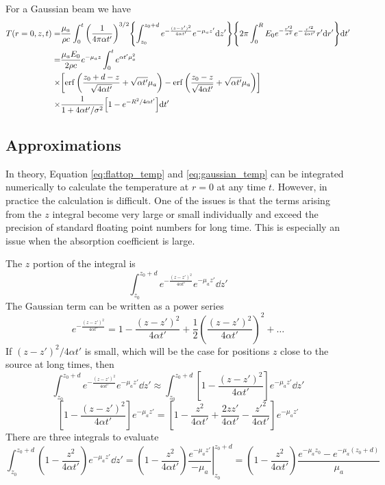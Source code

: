 \documentclass[]{article}
\begin{document}
For a Gaussian beam we have
\begin{align}
  \label{eq:gaussian_temp}
  T(r =0,z,t) =& \frac{\mu_a}{\rho c} \int_0^t \qty(\frac{1}{4\pi \alpha t'})^{3/2} \qty{\int_{z_0}^{z_0 + d}e^{-\frac{(z-z')^2}{4\alpha t'}} e^{-\mu_a z'} \dd z'} \qty{2\pi\int_{0}^{R} E_0 e^{-\frac{r'^2}{\sigma^2}} e^{-\frac{r'^2}{4\alpha t'}}r'\dd r'}\dd t' \\
  =& \frac{\mu_aE_0}{2\rho c}e^{-\mu_a z} \int_0^t e^{\alpha t'\mu_a^2}  \\
  \times & \qty[\erf\qty(\frac{z_0 + d - z}{\sqrt{4\alpha t'}} + \sqrt{\alpha t'}\mu_a ) - \erf\qty(\frac{z_0 - z}{\sqrt{4\alpha t'}} + \sqrt{\alpha t'}\mu_a ) ] \\
  \times & \frac{1}{1 + 4\alpha t'/\sigma^2} \qty[1 - e^{-R^2/4\alpha t'} ]
  \dd t'
\end{align}


\subsection{Approximations}

In theory, Equation \ref{eq:flattop_temp} and \ref{eq:gaussian_temp} can be integrated
numerically to calculate the temperature at $r = 0$ at any time $t$. However,
in practice the calculation is difficult. One of the issues is that the
terms arising from the $z$ integral become very large or small individually and
exceed the precision of standard floating point numbers for long time. This
is especially an issue when the absorption coefficient is large.

The $z$ portion of the integral is
\begin{equation*}
    \int_{z_0}^{z_0 + d} e^{-\frac{(z-z')^2}{4\alpha t'}} e^{-\mu_a z'} \dd z'
\end{equation*}
The Gaussian term can be written as a power series
\begin{equation*}
  e^{-\frac{(z-z')^2}{4\alpha t'}} = 1 - \frac{(z-z')^2}{4\alpha t'} + \frac{1}{2}\left(\frac{(z-z')^2}{4\alpha t'}\right)^2 + \ldots
\end{equation*}
If $(z-z')^2/4\alpha t'$ is small, which will be the case for positions $z$ close
to the source at long times, then
\begin{equation*}
    \int_{z_0}^{z_0 + d} e^{-\frac{(z-z')^2}{4\alpha t'}} e^{-\mu_a z'} \dd z' \approx
    \int_{z_0}^{z_0 + d} \left[1 - \frac{(z-z')^2}{4\alpha t'}\right] e^{-\mu_a z'} \dd z'
\end{equation*}
\begin{equation*}
    \left[1 - \frac{(z-z')^2}{4\alpha t'}\right] e^{-\mu_a z'}
=   \left[1 - \frac{z^2}{4\alpha t'} + \frac{2zz'}{4\alpha t'} -\frac{z'^2}{4\alpha t'}\right] e^{-\mu_a z'}
\end{equation*}
There are three integrals to evaluate
\begin{equation*}
    \int_{z_0}^{z_0 + d}
   \left(1 -  \frac{z^2}{4\alpha t'}\right)e^{-\mu_a z'}
    \dd z' =
    \left.\left(1 -  \frac{z^2}{4\alpha t'}\right)\frac{e^{-\mu_a z'}}{-\mu_a} \right|_{z_0}^{z_0 + d}
    = \left(1 -  \frac{z^2}{4\alpha t'}\right)\frac{e^{-\mu_a z_0} - e^{-\mu_a (z_0+d)}}{\mu_a}
\end{equation*}
\end{document}

